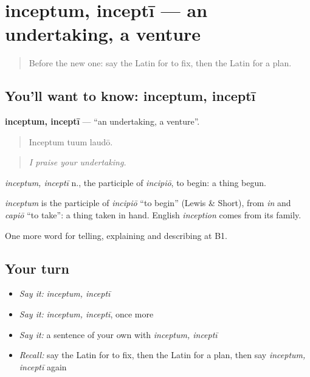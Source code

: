 \section[inceptum, inceptī]{inceptum, inceptī — an undertaking, a venture}

\label{lesson:LA-C393-inceptum}



\begin{quote}
Before the new one: say the Latin for to fix, then the Latin for a plan.
\end{quote}

\subsection*{You'll want to know: inceptum, inceptī}
\textbf{inceptum, inceptī} — \textquotedblleft{}an undertaking, a venture\textquotedblright{}.

\begin{quote}
Inceptum tuum laudō.
\end{quote}

\begin{quote}
\emph{I praise your undertaking.}
\end{quote}

\emph{inceptum, inceptī} n., the participle of \emph{incipiō}, to begin: a thing begun.

\begin{cousinweb}
\emph{inceptum} is the participle of \emph{incipiō} \textquotedblleft{}to begin\textquotedblright{} (Lewis \& Short), from \emph{in} and \emph{capiō} \textquotedblleft{}to take\textquotedblright{}: a thing taken in hand. English \emph{inception} comes from its family.
\end{cousinweb}

\begin{grammarlens}[title={What you've built}]
One more word for telling, explaining and describing at B1.
\end{grammarlens}

\subsection*{Your turn}
\begin{itemize}
\raggedright
  \item \emph{Say it:} \emph{inceptum, inceptī}
  \item \emph{Say it:} \emph{inceptum, inceptī}, once more
  \item \emph{Say it:} a sentence of your own with \emph{inceptum, inceptī}
  \item \emph{Recall:} say the Latin for to fix, then the Latin for a plan, then say \emph{inceptum, inceptī} again
\end{itemize}


